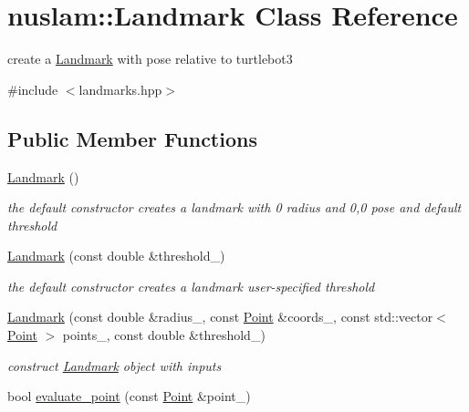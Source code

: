 \hypertarget{classnuslam_1_1Landmark}{}\section{nuslam\+:\+:Landmark Class Reference}
\label{classnuslam_1_1Landmark}


create a \hyperlink{classnuslam_1_1Landmark}{Landmark} with pose relative to turtlebot3  




{\ttfamily \#include $<$landmarks.\+hpp$>$}

\subsection*{Public Member Functions}
\begin{DoxyCompactItemize}
\item 
\mbox{\label{classnuslam_1_1Landmark_acff6c586a3b2170a55df614189143762}} 
\hyperlink{classnuslam_1_1Landmark_acff6c586a3b2170a55df614189143762}{Landmark} ()
\begin{DoxyCompactList}\small\item\em the default constructor creates a landmark with 0 radius and 0,0 pose and default threshold \end{DoxyCompactList}\item 
\hyperlink{classnuslam_1_1Landmark_aa5b87e30cb0f736c128227854a89fa0d}{Landmark} (const double \&threshold\+\_\+)
\begin{DoxyCompactList}\small\item\em the default constructor creates a landmark user-\/specified threshold \end{DoxyCompactList}\item 
\hyperlink{classnuslam_1_1Landmark_a6f72de6e4e763c25800a29e0d1539f04}{Landmark} (const double \&radius\+\_\+, const \hyperlink{structnuslam_1_1Point}{Point} \&coords\+\_\+, const std\+::vector$<$ \hyperlink{structnuslam_1_1Point}{Point} $>$ points\+\_\+, const double \&threshold\+\_\+)
\begin{DoxyCompactList}\small\item\em construct \hyperlink{classnuslam_1_1Landmark}{Landmark} object with inputs \end{DoxyCompactList}\item 
bool \hyperlink{classnuslam_1_1Landmark_ad0d542b25fe1fe98bf7ee989a23438ad}{evaluate\+\_\+point} (const \hyperlink{structnuslam_1_1Point}{Point} \&point\+\_\+)

\end{DoxyCompactItemize}
